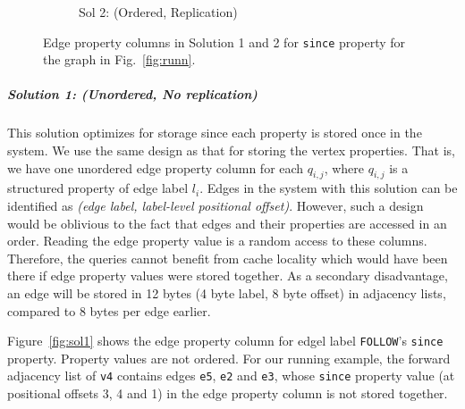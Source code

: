 \begin{figure}
\begin{subfigure}{0.55\textwidth}
		\captionsetup{justification=centering}
		\caption{Sol 2: (Ordered, Replication)}
		\label{fig:sol2}
	\end{subfigure}
	\captionsetup{justification=centering}
	\caption{Edge property columns in Solution 1 and 2 for \texttt{since} property for the graph in Fig.~\ref{fig:runn}.}
	\label{fig:sol1and2}
	\vspace{-8pt}
\end{figure}

\vspace{-12pt}
\subparagraph{Solution 1: (Unordered, No replication) } This solution optimizes for storage since each property is stored once in the system. We use the same design as that for storing the vertex properties. That is, we have one unordered edge property column for each $q_{i,j}$, where $q_{i,j}$ is a structured property of edge label $l_i$. Edges in the system with this solution can be identified as \emph{(edge label, label-level positional offset)}. However, such a design would be oblivious to the fact that edges and their properties are accessed in an order. Reading the edge property value is a random access to these columns. Therefore, the queries cannot benefit from cache locality which would have been there if edge property values were stored together. As a secondary disadvantage, an edge will be stored in 12 bytes (4 byte label, 8 byte offset) in adjacency lists, compared to 8 bytes per edge earlier.

Figure~\ref{fig:sol1} shows the edge property column for edgel label \texttt{FOLLOW}'s \texttt{since} property. Property values are not ordered. For our running example, the forward adjacency list of \texttt{v4} contains edges \texttt{e5}, \texttt{e2} and \texttt{e3}, whose \texttt{since} property value (at positional offsets 3, 4 and 1) in the edge property column is not stored together. 

\vspace{-12pt}

